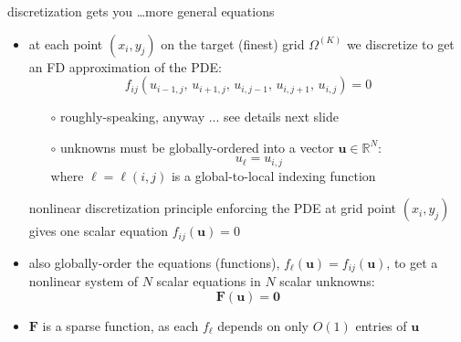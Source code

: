 \documentclass[10pt,
               svgnames,
               hyperref={colorlinks,citecolor=DeepPink4,linkcolor=FireBrick,urlcolor=Maroon},
               usepdftitle=false]{beamer}
\newcommand{\bu}{\mathbf{u}}
\newcommand{\bF}{\mathbf{F}}
\newcommand{\bzero}{\bm{0}}
\newcommand{\RR}{\mathbb{R}}
\begin{document}
\begin{frame}{discretization gets you \dots more general equations}
\begin{itemize}
\item at each point $(x_i,y_j)$ on the target (finest) grid $\Omega^{(K)}$ we discretize to get an FD approximation of the PDE:
    $$f_{ij}(u_{i-1,j},\,u_{i+1,j},\,u_{i,j-1},\,u_{i,j+1},\,u_{i,j}) = 0$$

	\begin{itemize}
	\item[$\circ$] roughly-speaking, anyway ... see details next slide
	\item[$\circ$] unknowns must be globally-ordered into a vector $\bu \in \RR^N$:
	    $$u_\ell = u_{i,j}$$
    where $\ell=\ell(i,j)$ is a global-to-local indexing function
	\end{itemize}

\medskip
\begin{block}{nonlinear discretization principle}
enforcing the PDE at grid point $(x_i,y_j)$ gives one scalar equation $f_{ij}(\bu) = 0$
\end{block}

\bigskip
\item also globally-order the equations (functions), $f_\ell(\bu) = f_{ij}(\bu)$, to get a nonlinear system of $N$ scalar equations in $N$ scalar unknowns:
    $$\bF(\bu) = \bzero$$
\item $\bF$ is a sparse function, as each $f_\ell$ depends on only $O(1)$ entries of $\bu$
\end{itemize}
\end{frame}
\end{document}

